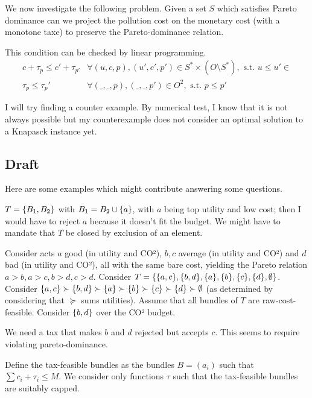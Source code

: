 \documentclass[version=3.21, pagesize, twoside=off, bibliography=totoc, DIV=calc, fontsize=12pt, a4paper, french, english]{scrartcl}
\begin{document}
We now investigate the following problem. Given a set $S$ which satisfies Pareto dominance can we project the pollution cost on the monetary cost (with a monotone taxe) to preserve the Pareto-dominance relation. 

This condition can be checked by linear programming. 
\begin{align}
c+\tau_p \le c' + \tau_{p'} &\forall (u,c,p), (u',c',p') \in S^*\times(O\setminus S^*) ,\text{ s.t. } u \le u' \in \\
\tau_p \le \tau_p' & \forall (\_,\_,p), (\_,\_,p') \in O^2 ,\text{ s.t. }  p \le p'
\end{align} 

I will try finding a counter example. By numerical test, I know that it is not always possible but my counterexample does not consider an optimal solution to a Knapasck instance yet.

\subsection{Draft}
Here are some examples which might contribute answering some questions.
\begin{example}
	$T = \{B_1, B_2\}$ with $B_1 = B_2 \cup \{a\}$, with $a$ being top utility and low cost; then I would have to reject $a$ because it doesn’t fit the budget.
	We might have to mandate that $T$ be closed by exclusion of an element.
\end{example}

\begin{example}
	Consider acts $a$ good (in utility and CO²), $b, c$ average (in utility and CO²) and $d$ bad (in utility and CO²), all with the same bare cost, yielding the Pareto relation $a > b, a > c, b > d, c > d$.
	Consider $T = \{\{a, c\}, \{b, d\}, \{a\}, \{b\}, \{c\}, \{d\}, \emptyset\}$. 
	Consider $\{a, c\} \succ \{b, d\} \succ \{a\} \succ \{b\} \succ \{c\} \succ \{d\} \succ \emptyset$ (as determined by considering that $\succeq$ sums utilities).
	Assume that all bundles of $T$ are raw-cost-feasible.
	Consider $\{b, d\}$ over the CO² budget.
	
	We need a tax that makes $b$ and $d$ rejected but accepts $c$.
	This seems to require violating pareto-dominance.
\end{example}

Define the tax-feasible bundles as the bundles $B = (a_i)$ such that $\sum c_i + \tau_i ≤ M$.
We consider only functions $\tau$ such that the tax-feasible bundles are suitably capped.
\end{document}
